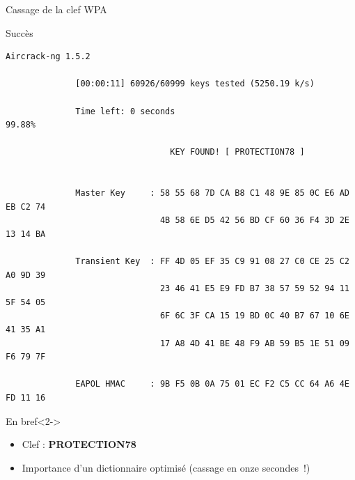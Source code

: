 \documentclass[10pt,sans,usenames,dvipsnames,french,compress]{beamer}
\begin{document}
\begin{frame}[fragile]{Cassage de la clef WPA}
	\vspace{-1mm}
	\begin{block}{Succès}
		\vspace{-3mm}
		\begin{lstlisting}[style=Term]
		                              Aircrack-ng 1.5.2 

		      [00:00:11] 60926/60999 keys tested (5250.19 k/s) 

		      Time left: 0 seconds                                      99.88%

		                         KEY FOUND! [ PROTECTION78 ]


		      Master Key     : 58 55 68 7D CA B8 C1 48 9E 85 0C E6 AD EB C2 74 
		                       4B 58 6E D5 42 56 BD CF 60 36 F4 3D 2E 13 14 BA 

		      Transient Key  : FF 4D 05 EF 35 C9 91 08 27 C0 CE 25 C2 A0 9D 39 
		                       23 46 41 E5 E9 FD B7 38 57 59 52 94 11 5F 54 05 
		                       6F 6C 3F CA 15 19 BD 0C 40 B7 67 10 6E 41 35 A1 
		                       17 A8 4D 41 BE 48 F9 AB 59 B5 1E 51 09 F6 79 7F 

		      EAPOL HMAC     : 9B F5 0B 0A 75 01 EC F2 C5 CC 64 A6 4E FD 11 16
		\end{lstlisting}
		\vspace{-2mm}

	\end{block}
	\vspace{-1mm}
	\begin{exampleblock}{En bref}<2->
		\begin{itemize}
			\item Clef : \textbf{PROTECTION78}
			\item<3-> Importance d'un dictionnaire optimisé (cassage en onze secondes !)
		\end{itemize}
	\end{exampleblock}
\end{frame}
\end{document}
